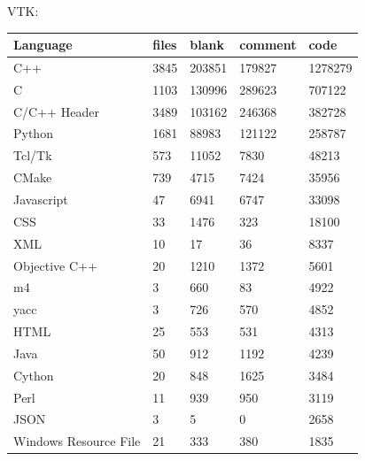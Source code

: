  VTK:
\begin{center}
\begin{tabular}{ l|l|l|l|l }
	\hline
	\textbf{Language}&      \textbf{files}&\textbf{blank}& \textbf{comment}& \textbf{code}\\
	\hline
	C++                                   &3845         &203851         &179827        &1278279\\
	C                                     &1103         &130996         &289623        &707122\\
	C/C++ Header                          &3489         &103162         &246368        & 382728\\
	Python                                &1681         & 88983         &121122        & 258787\\
	Tcl/Tk                                & 573         & 11052         &  7830        &  48213\\
	CMake                                 & 739         &  4715         &  7424        &  35956\\
	Javascript                            &  47         &  6941         &  6747        &  33098\\
	CSS                                   &  33         &  1476         &   323        &  18100\\
	XML                                   &  10         &    17         &    36        &   8337\\
	Objective C++                         &  20         &  1210         &  1372        &   5601\\
	m4                                    &   3         &   660         &    83        &   4922\\
	yacc                                  &   3         &   726         &   570        &   4852\\
	HTML                                  &  25         &   553         &   531        &   4313\\
	Java                                  &  50         &   912         &  1192        &   4239\\
	Cython                                &  20         &   848         &  1625        &   3484\\
	Perl                                  &  11         &   939         &   950        &   3119\\
	JSON                                  &   3         &     5         &     0        &   2658\\
	Windows Resource File                 &  21         &   333         &   380        &   1835\\

\end{tabular}
\end{center}
